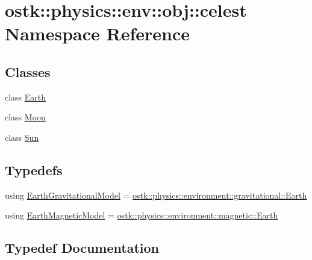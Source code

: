 \hypertarget{namespaceostk_1_1physics_1_1env_1_1obj_1_1celest}{}\section{ostk\+:\+:physics\+:\+:env\+:\+:obj\+:\+:celest Namespace Reference}
\label{namespaceostk_1_1physics_1_1env_1_1obj_1_1celest}
\subsection*{Classes}
\begin{DoxyCompactItemize}
\item 
class \hyperlink{classostk_1_1physics_1_1env_1_1obj_1_1celest_1_1_earth}{Earth}
\item 
class \hyperlink{classostk_1_1physics_1_1env_1_1obj_1_1celest_1_1_moon}{Moon}
\item 
class \hyperlink{classostk_1_1physics_1_1env_1_1obj_1_1celest_1_1_sun}{Sun}
\end{DoxyCompactItemize}
\subsection*{Typedefs}
\begin{DoxyCompactItemize}
\item 
using \hyperlink{namespaceostk_1_1physics_1_1env_1_1obj_1_1celest_afb7c5d16d89de6cfcf563f89088f69c5}{Earth\+Gravitational\+Model} = \hyperlink{classostk_1_1physics_1_1environment_1_1gravitational_1_1_earth}{ostk\+::physics\+::environment\+::gravitational\+::\+Earth}
\item 
using \hyperlink{namespaceostk_1_1physics_1_1env_1_1obj_1_1celest_ac56a1ac811d11e06caa66c76debac944}{Earth\+Magnetic\+Model} = \hyperlink{classostk_1_1physics_1_1environment_1_1magnetic_1_1_earth}{ostk\+::physics\+::environment\+::magnetic\+::\+Earth}
\end{DoxyCompactItemize}


\subsection{Typedef Documentation}
\mbox{\label{namespaceostk_1_1physics_1_1env_1_1obj_1_1celest_afb7c5d16d89de6cfcf563f89088f69c5}} 
